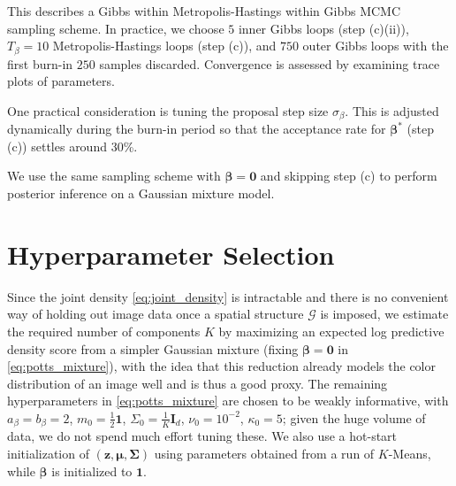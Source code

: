 \documentclass[12pt]{article}
\newcommand{\GG}{\mathcal{G}}
\begin{document}
This describes a Gibbs within Metropolis-Hastings within Gibbs MCMC sampling
scheme.
In practice, we choose $5$ inner Gibbs loops (step (c)(ii)), $T_\beta = 10$
Metropolis-Hastings loops (step (c)), and $750$ outer Gibbs loops with the
first burn-in $250$ samples discarded.
Convergence is assessed by examining trace plots of parameters.

One practical consideration is tuning the proposal step size $\sigma_\beta$.
This is adjusted dynamically during the burn-in period so that the acceptance
rate for $\bm\beta^*$ (step (c)) settles around 30\%.

We use the same sampling scheme with $\bm{\beta} = \bm0$ and skipping step (c)
to perform posterior inference on a Gaussian mixture model.


\section{Hyperparameter Selection}
\label{sec:hyperparameter}

Since the joint density \eqref{eq:joint_density} is intractable and there is no
convenient way of holding out image data once a spatial structure $\GG$ is
imposed, we estimate the required number of components $K$ by maximizing an
expected log predictive density score from a simpler Gaussian mixture (fixing
$\bm\beta = \bm0$ in \ref{eq:potts_mixture}), with the idea that this reduction
already models the color distribution of an image well and is thus a good
proxy.
The remaining hyperparameters in \eqref{eq:potts_mixture} are chosen to be
weakly informative, with $a_\beta = b_\beta = 2$, $m_0 = \frac{1}{2}\bm{1}$,
$\Sigma_0 = \frac{1}{K}\bm{I}_d$, $\nu_0 = 10^{-2}$, $\kappa_0 = 5$; given the
huge volume of data, we do not spend much effort tuning these.
We also use a hot-start initialization of $(\bm{z}, \bm{\mu}, \bm{\Sigma})$
using parameters obtained from a run of $K$-Means, while $\bm{\beta}$ is
initialized to $\bm{1}$.
\end{document}

